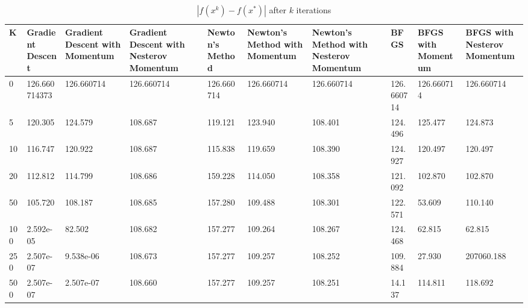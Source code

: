 \documentclass{article}
\begin{document}
\begin{center}
\begin{table}[H]
	\centering
	\caption{$ | f(x^k) - f(x^*) | $ after $k$ iterations}
	\label{Bird's function table}
	\begin{tabular}{|l|p{1.2cm}|p{1.2cm}|p{1.2cm}|p{1.2cm}|p{1.2cm}|p{1.2cm}|p{1.2cm}|p{1.2cm}|p{1.2cm}|}
		\hline
		K & Gradient Descent & Gradient Descent with Momentum & Gradient Descent with Nesterov Momentum & Newton's Method & Newton's Method with Momentum & Newton's Method with Nesterov Momentum & BFGS & BFGS with Momentum & BFGS with Nesterov Momentum \\
		\hline
		0 & 126.660714373 & 126.660714 & 126.660714 & 126.660714 & 126.660714 & 126.660714 & 126.660714 & 126.660714 & 126.660714 \\
		\hline
		5 & 120.305 & 124.579 & 108.687 & 119.121 & 123.940 & 108.401 & 124.496 & 125.477 & 124.873 \\
		\hline
		10 & 116.747 & 120.922 & 108.687 & 115.838 & 119.659 & 108.390 & 124.927 & 120.497 & 120.497 \\
		\hline
		20 & 112.812 & 114.799 & 108.686 & 159.228 & 114.050 & 108.358 & 121.092 & 102.870 & 102.870 \\
		\hline
		50 & 105.720 & 108.187 & 108.685 & 157.280 & 109.488 & 108.301 & 122.571 & 53.609 & 110.140 \\
		\hline
		100 & 2.592e-05 & 82.502 & 108.682 & 157.277 & 109.264 & 108.267 & 124.468 & 62.815 & 62.815 \\
		\hline
		250 & 2.507e-07 & 9.538e-06 & 108.673 & 157.277 & 109.257 & 108.252 & 109.884 & 27.930 & 207060.188 \\
		\hline
		500 & 2.507e-07 & 2.507e-07 & 108.660 & 157.277 & 109.257 & 108.251 & 14.137 & 114.811 & 118.692 \\
		\hline
	\end{tabular}
\end{table}
\end{center}
\end{document}
